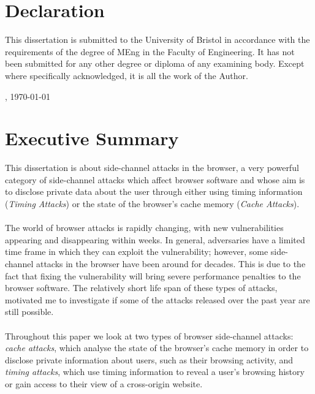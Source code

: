 \documentclass[10pt,a4paper,twoside]{book}
\begin{document}

\cleardoublepage
\pagestyle{plain}


\newpage
  \thispagestyle{plain}

  \chapter*{Declaration}

  This dissertation is submitted to the University of Bristol in accordance 
  with the requirements of the degree of MEng in the Faculty 
  of Engineering.  It has not been submitted for any other degree or diploma 
  of any examining body.  Except where specifically acknowledged, it is all 
  the work of the Author. 

  \vspace{6cm}

  , \today


\tableofcontents
\listoffigures
\listoftables
\listofalgorithms
\lstlistoflistings




\chapter*{Executive Summary}

This dissertation is about side-channel attacks in the browser, a very powerful category of side-channel attacks which affect browser software and whose aim is to disclose private data about the user through either using timing information (\textit{Timing Attacks}) or the state of the browser's cache memory (\textit{Cache Attacks}). 
\\\\
\noindent
The world of browser attacks is rapidly changing, with new vulnerabilities appearing and disappearing within weeks. In general, adversaries have a limited time frame in which they can exploit the vulnerability; however, some side-channel attacks in the browser have been around for decades. This is due to the fact that fixing the vulnerability will bring severe performance penalties to the browser software. The relatively short life span of these types of attacks, motivated me to investigate if some of the attacks released over the past year are still possible.  
\\\\
\noindent
Throughout this paper we look at two types of browser side-channel attacks: \textit{cache attacks}, which analyse the state of the browser's cache memory in order to disclose private information about users, such as their browsing activity, and \textit{timing attacks}, which use timing information to reveal a user's browsing history or gain access to their view of a cross-origin website.
\end{document}
